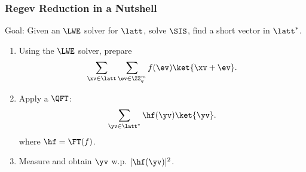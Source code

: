 \begin{frame}
  \frametitle{Regev Reduction in a Nutshell}

  Goal: Given an $\LWE$ solver for $\latt$, solve $\SIS$, \ie{} find a short vector in $\latt^*$.
  \pause\vfill

  \begin{minipage}{.45\textwidth}
    \begin{enumerate}
      \item Using the $\LWE$ solver, prepare
      $$
        \sum_{\xv \in \latt} \sum_{\ev \in \ZZ_q^m} f(\ev) \ket{\xv + \ev}.
      $$
      \item<3-> Apply a $\QFT$:
      $$
        \sum_{\yv \in \latt^*} \hf(\yv) \ket{\yv}.
      $$
      {\small where $\hf = \FT(f)$.}
      \item<5-> Measure and obtain $\yv$ w.p. $|\hf(\yv)|^2$.
    \end{enumerate}
  \end{minipage}
\end{frame}
